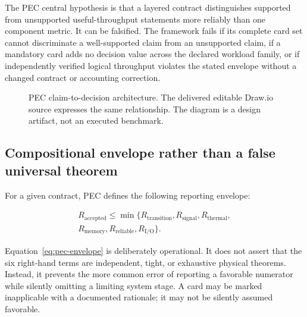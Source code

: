 \documentclass[conference]{IEEEtran}
\begin{document}
The PEC central hypothesis is that a layered contract distinguishes supported
from unsupported useful-throughput statements more reliably than one component
metric. It can be falsified. The framework fails if its complete card set
cannot discriminate a well-supported claim from an unsupported claim, if a
mandatory card adds no decision value across the declared workload family, or
if independently verified logical throughput violates the stated envelope
without a changed contract or accounting correction.

\begin{figure}[t]
\centering
{}
\caption{PEC claim-to-decision architecture. The delivered editable Draw.io
source expresses the same relationship. The diagram is a design artifact, not
an executed benchmark.}
\label{fig:pec-flow}
\end{figure}

\subsection{Compositional envelope rather than a false universal theorem}

For a given contract, PEC defines the following reporting envelope:

\begin{align}
R_{\mathrm{accepted}} \leq
\min\{R_{\mathrm{transition}},R_{\mathrm{signal}},
R_{\mathrm{thermal}}, \nonumber\\
R_{\mathrm{memory}},R_{\mathrm{reliable}},R_{\mathrm{I/O}}\}.
\label{eq:pec-envelope}
\end{align}

Equation~\eqref{eq:pec-envelope} is deliberately operational. It does not
assert that the six right-hand terms are independent, tight, or exhaustive
physical theorems. Instead, it prevents the more common error of reporting a
favorable numerator while silently omitting a limiting system stage. A card
may be marked inapplicable with a documented rationale; it may not be
silently assumed favorable.
\end{document}
